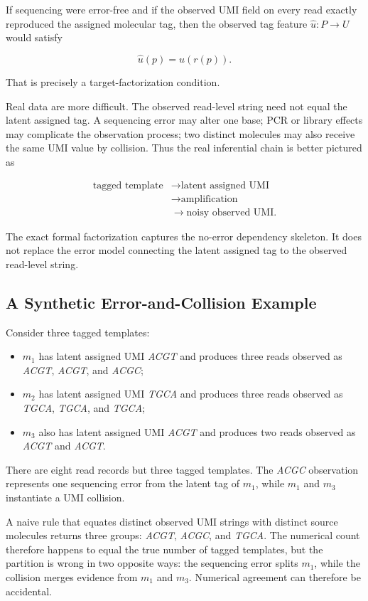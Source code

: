 \documentclass[12pt]{article}
\begin{document}
If sequencing were error-free and if the observed UMI field on every read exactly reproduced the assigned molecular tag, then the observed tag feature \(\widehat u:P\to U\) would satisfy

\[
\widehat u(p)=u(r(p)).
\]

That is precisely a target-factorization condition.

Real data are more difficult. The observed read-level string need not equal the latent assigned tag. A sequencing error may alter one base; PCR or library effects may complicate the observation process; two distinct molecules may also receive the same UMI value by collision. Thus the real inferential chain is better pictured as

\[
\begin{aligned}
\text{tagged template}
&\to \text{latent assigned UMI}\\
&\to \text{amplification}\\
&\to \text{noisy observed UMI}.
\end{aligned}
\]

The exact formal factorization captures the no-error dependency skeleton. It does not replace the error model connecting the latent assigned tag to the observed read-level string.

\subsection{A Synthetic Error-and-Collision Example}

Consider three tagged templates:

\begin{itemize}[leftmargin=*]
\item \(m_1\) has latent assigned UMI \emph{ACGT} and produces three reads observed as \emph{ACGT}, \emph{ACGT}, and \emph{ACGC};
\item \(m_2\) has latent assigned UMI \emph{TGCA} and produces three reads observed as \emph{TGCA}, \emph{TGCA}, and \emph{TGCA};
\item \(m_3\) also has latent assigned UMI \emph{ACGT} and produces two reads observed as \emph{ACGT} and \emph{ACGT}.
\end{itemize}

There are eight read records but three tagged templates. The \emph{ACGC} observation represents one sequencing error from the latent tag of \(m_1\), while \(m_1\) and \(m_3\) instantiate a UMI collision.

A naive rule that equates distinct observed UMI strings with distinct source molecules returns three groups: \emph{ACGT}, \emph{ACGC}, and \emph{TGCA}. The numerical count therefore happens to equal the true number of tagged templates, but the partition is wrong in two opposite ways: the sequencing error splits \(m_1\), while the collision merges evidence from \(m_1\) and \(m_3\). Numerical agreement can therefore be accidental.
\end{document}
